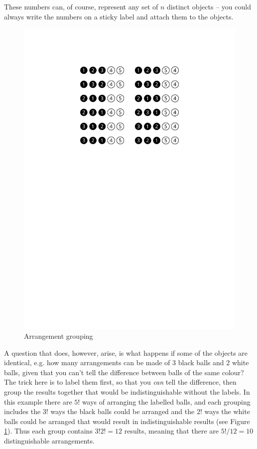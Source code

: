 \documentclass[a5paper]{article}
\begin{document}
These numbers can, of course, represent any set of $n$ distinct objects -- you
could always write the numbers on a sticky label and attach them to the objects.

\begin{figure}[ht]
  \begin{center}
    \includegraphics{arrangement-grouping}
  \end{center}

  \caption{Arrangement grouping}
  \label{fig:2}
\end{figure}

A question that does, however, arise, is what happens if some of the objects are
identical, e.g. how many arrangements can be made of 3 black balls and 2 white
balls, given that you can't tell the difference between balls of the same
colour? The trick here is to label them first, so that you \textit{can} tell the
difference, then group the results together that would be indistinguishable
without the labels. In this example there are $5!$ ways of arranging the
labelled balls, and each grouping includes the $3!$ ways the black balls could
be arranged and the $2!$ ways the white balls could be arranged that would
result in indistinguishable results (see Figure \ref{fig:2}). Thus each group
contains $3!2! = 12$ results, meaning that there are $5!/12 = 10$
distinguishable arrangements.
\end{document}
